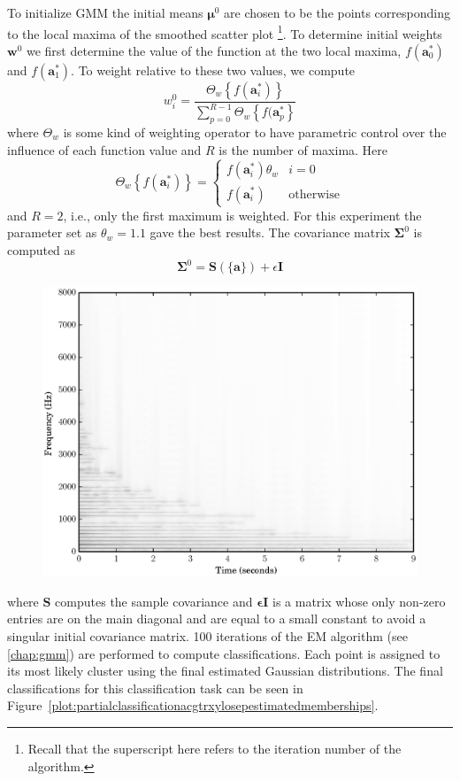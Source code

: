 To initialize GMM the initial means $\boldsymbol{\mu}^{0}$ are chosen to be the
points corresponding to the local maxima of the smoothed scatter plot%
\footnote{Recall that the superscript here refers to the iteration number of the
algorithm.}. To
determine initial weights $\boldsymbol{w}^{0}$ we first determine the value of
the function at the two local maxima, $f(\boldsymbol{a}_{0}^{\ast})$ and
$f(\boldsymbol{a}_{1}^{\ast})$. To weight relative to these two values, we
compute
\[
    w_{i}^{0} = \frac{\Theta_{w} \left\{ f(\boldsymbol{a}_{i}^{\ast}) \right\}}{
    \sum_{p=0}^{R-1}\Theta_{w} \left\{ f(\boldsymbol{a}_{p}^{\ast} \right\}}
\]
where $\Theta_{w}$ is some kind of weighting operator to have parametric control
over the influence of each function value and $R$ is the number of maxima. Here
\[
    \Theta_{w} \left\{ f(\boldsymbol{a}_{i}^{\ast}) \right\}
    = \begin{cases}
        f(\boldsymbol{a}_{i}^{\ast}) \theta_{w} & i = 0 \\
        f(\boldsymbol{a}_{i}^{\ast}) & \text{otherwise}
    \end{cases}
\]
and $R = 2$, i.e., only the first maximum is weighted. For this experiment the parameter set as $\theta_{w} = 1.1$ gave
the best results. The covariance matrix $\boldsymbol{\Sigma}^{0}$ is computed as
\[
    \boldsymbol{\Sigma}^{0} = \boldsymbol{S}(\{ \boldsymbol{a} \}) +
    \epsilon\boldsymbol{I}
\]
\begin{figure}[t]
    \centering
    \includegraphics[width=\figwidthscale\textwidth]{plots/ac_gtr_ss_spec.eps}
    \CaptionWithTitle{%
    }{\label{plot:acgtra3specgramss}}
\end{figure}%
where $\boldsymbol{S}$ computes the sample covariance and
$\boldsymbol{\epsilon}\boldsymbol{I}$ is a matrix whose only non-zero entries
are on the main diagonal and are equal to a small constant to avoid a singular
initial covariance matrix. 100 iterations of the EM algorithm (see
\ref{chap:gmm}) are performed to compute classifications. Each point is assigned
to its most likely cluster using the final estimated Gaussian distributions. The
final classifications for this classification task can be seen in
Figure~\ref{plot:partialclassificationacgtrxylosepestimatedmemberships}.

